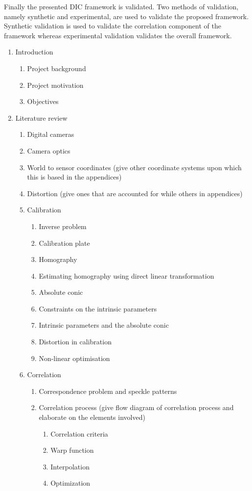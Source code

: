 \documentclass[12pt,oneside,openany,a4paper, %
english, %
masters-t, goldenblock]{usthesis}
\begin{document}
Finally the presented DIC framework is validated. Two methods of validation, namely synthetic and experimental, are used to validate the proposed framework. Synthetic validation is used to validate the correlation component of the framework whereas experimental validation validates the overall framework.




\begin{enumerate}
\item Introduction
  \begin{enumerate}
    \item Project background
    \item Project motivation
    \item Objectives
  \end{enumerate}
\item Literature review
  \begin{enumerate}
    \item Digital cameras
    \item Camera optics
    \item World to sensor coordinates (give other coordinate systems upon which this is based in the appendices)
    \item Distortion (give ones that are accounted for while others in appendices)
    \item Calibration
      \begin{enumerate}
        \item Inverse problem
        \item Calibration plate
        \item Homography
        \item Estimating homography using direct linear transformation
        \item Absolute conic
        \item Constraints on the intrinsic parameters
        \item Intrinsic parameters and the absolute conic
        \item Distortion in calibration
        \item Non-linear optimisation
      \end{enumerate}
    \item Correlation
    \begin{enumerate}
      \item Correspondence problem and speckle patterns
      \item Correlation process (give flow diagram of correlation process and elaborate on the elements involved)
        \begin{enumerate}
          \item Correlation criteria
          \item Warp function
          \item Interpolation
          \item Optimization
        \end{enumerate}
      \end{enumerate}
  \end{enumerate}


\end{enumerate}
\end{document}
